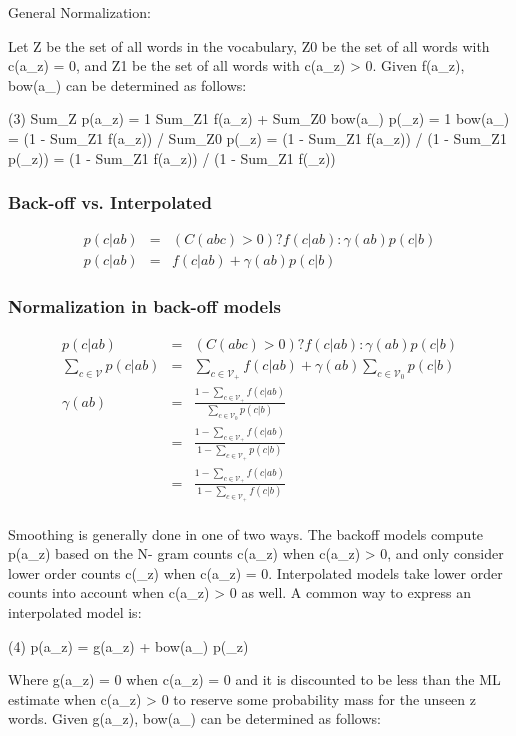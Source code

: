 \documentclass[ignorenonframetext]{beamer}
\newcommand{\vocab}{\mathcal{V}}
\begin{document}
       General Normalization:

       Let Z be the set of all words in the vocabulary, Z0 be the set of all words with c(a_z) = 0,  and  Z1
       be the set of all words with c(a_z) > 0.  Given f(a_z), bow(a_) can be determined as follows:

       (3)  Sum_Z  p(a_z) = 1
            Sum_Z1 f(a_z) + Sum_Z0 bow(a_) p(_z) = 1
            bow(a_) = (1 - Sum_Z1 f(a_z)) / Sum_Z0 p(_z)
                    = (1 - Sum_Z1 f(a_z)) / (1 - Sum_Z1 p(_z))
                    = (1 - Sum_Z1 f(a_z)) / (1 - Sum_Z1 f(_z))

\begin{frame}\frametitle{Back-off vs. Interpolated}
\begin{eqnarray*}
p(c|ab) &=& (C(abc) > 0) ? f(c|ab) : \gamma(ab) p(c|b) \\
p(c|ab) &=& f(c|ab) + \gamma(ab) p(c|b)
\end{eqnarray*}
\end{frame}

\begin{frame}\frametitle{Normalization in back-off models}
\begin{eqnarray*}
p(c|ab) &=& (C(abc) > 0) ? f(c|ab) : \gamma(ab) p(c|b) \\
\sum_{c\in\vocab} p(c|ab) &=& \sum_{c\in\vocab_{+}} f(c|ab) +
\gamma(ab) \sum_{c\in\vocab_{0}} p(c|b) \\
\gamma(ab) &=& \frac{1 - \sum_{c\in\vocab_{+}}
  f(c|ab)}{\sum_{c\in\vocab_{0}} p(c|b)} \\
&=& \frac{1 - \sum_{c\in\vocab_{+}} f(c|ab)}{1 - \sum_{c\in\vocab_{+}}
  p(c|b)} \\
&=& \frac{1 - \sum_{c\in\vocab_{+}} f(c|ab)}{1 - \sum_{c\in\vocab_{+}}
  f(c|b)} \\
\end{eqnarray*}
\end{frame}

       Smoothing  is  generally  done in one of two ways.  The backoff models compute p(a_z) based on the N-
       gram counts c(a_z) when c(a_z) > 0, and only consider lower order  counts  c(_z)  when  c(a_z)  =  0.
       Interpolated  models  take  lower order counts into account when c(a_z) > 0 as well.  A common way to
       express an interpolated model is:

       (4)  p(a_z) = g(a_z) + bow(a_) p(_z)

       Where g(a_z) = 0 when c(a_z) = 0 and it is discounted to be less than the ML estimate when c(a_z) > 0
       to  reserve some probability mass for the unseen z words.  Given g(a_z), bow(a_) can be determined as
       follows:
\end{document}
